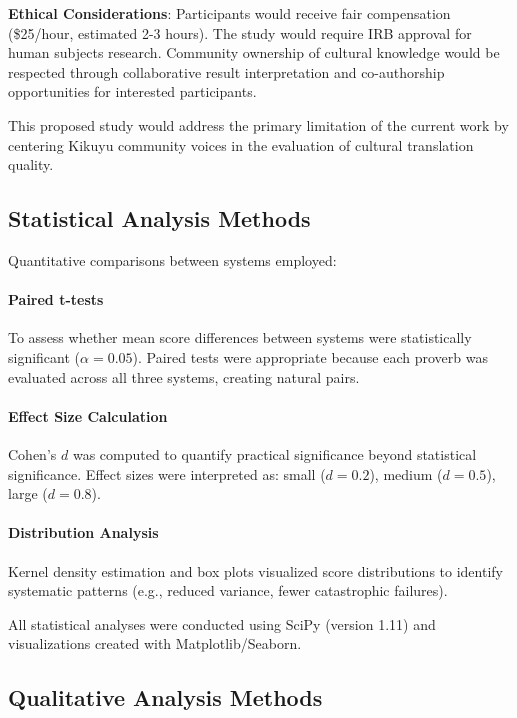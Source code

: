 \textbf{Ethical Considerations}: Participants would receive fair compensation (\$25/hour, estimated 2-3 hours). The study would require IRB approval for human subjects research. Community ownership of cultural knowledge would be respected through collaborative result interpretation and co-authorship opportunities for interested participants.

This proposed study would address the primary limitation of the current work by centering Kikuyu community voices in the evaluation of cultural translation quality.

\subsection{Statistical Analysis Methods}
\label{subsec:statistical_methods}

Quantitative comparisons between systems employed:

\paragraph{Paired t-tests} To assess whether mean score differences between systems were statistically significant ($\alpha = 0.05$). Paired tests were appropriate because each proverb was evaluated across all three systems, creating natural pairs.

\paragraph{Effect Size Calculation} Cohen's $d$ was computed to quantify practical significance beyond statistical significance. Effect sizes were interpreted as: small ($d = 0.2$), medium ($d = 0.5$), large ($d = 0.8$).

\paragraph{Distribution Analysis} Kernel density estimation and box plots visualized score distributions to identify systematic patterns (e.g., reduced variance, fewer catastrophic failures).

All statistical analyses were conducted using SciPy (version 1.11) and visualizations created with Matplotlib/Seaborn.

\subsection{Qualitative Analysis Methods}
\label{subsec:qualitative_methods}

